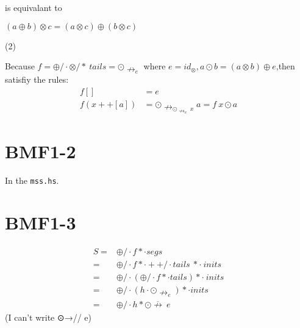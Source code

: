 \documentclass[UTF-8]{ctexart}
\begin{document}
is equivalant to
\begin{center}
	$\displaystyle ( a\oplus b) \otimes c=( a\otimes c) \oplus ( b\otimes c)$
	
	
	
\end{center}
(2)

Because $\displaystyle f=\oplus /\cdotp \otimes /*\ tails=\odot \nrightarrow _{e}$ where $\displaystyle e=id_{\otimes } ,a\odot b=( a\otimes b) \oplus e$,then satisfiy the rules:
\begin{equation*}
	\begin{aligned}
		f[] & =e\\
		f( x++[ a]) & =\odot \nrightarrow _{\odot \nrightarrow _{e} \ x} a=f\ x\odot a
	\end{aligned}
\end{equation*}

\section{BMF1-2}

In the \texttt{mss.hs}.

\section{BMF1-3}


\begin{equation*}
	\begin{aligned}
		S= & \oplus /\cdotp f*\cdotp segs\\
		= & \oplus /\cdotp f*\cdotp ++/\cdotp tails\ *\cdotp \ inits\\
		= & \oplus /\cdotp ( \oplus /\cdotp f*\cdotp tails) *\cdotp \ inits\\
		= & \oplus /\cdotp ( h\cdotp \odot \nrightarrow _{e}) *\cdotp inits\\
		= & \oplus /\cdotp h*\odot \overline{\nrightarrow } \ e
	\end{aligned}
\end{equation*}
(I can't write ⊙→// e) 
\end{document}
